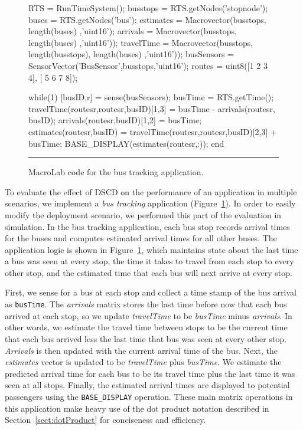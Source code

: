 \begin{figure}[t]
  \begin{macrolab}
    RTS = RunTimeSystem();
    busstops = RTS.getNodes('stopnode'); 
    buses = RTS.getNodes('bus');
    estimates = Macrovector(busstops, length(buses) ,'uint16');
    arrivals = Macrovector(busstops, length(buses) ,'uint16'));
    travelTime = Macrovector(busstops, length(busstops), length(buses) ,'uint16'));
    busSensors = SensorVector('BusSensor',busstops,'uint16');
    routes = uint8({[1 2 3 4], [ 5 6 7 8]}); %

    while(1)
      [busID,r] =  sense(busSensors);
      busTime = RTS.getTime();
      travelTime(routes{r},routes{r},busID)[1,3] = busTime - arrivals(routes{r}, busID);
      arrivals(routes{r},busID)[1,2] = busTime;
      estimates(routes{r},busID) = travelTime(routes{r},routes{r},busID)[2,3] + busTime;
      BASE_DISPLAY(estimates(routes{r},:));
    end
  \end{macrolab}
  \smallskip
  \hrule width 2\columnwidth
  \caption{MacroLab code for the bus tracking application.}
  \label{code:BusTracking}
\end{figure}

To evaluate the effect of DSCD on the performance of an application in multiple
scenarios, we implement a {\em bus tracking} application
(Figure~\ref{code:BusTracking}).  In order to easily modify the deployment
scenario, we performed this part of the evaluation in simulation.  In the bus
tracking application, each bus stop records arrival times for the buses and
computes estimated arrival times for all other buses. The application logic is
shown in Figure~\ref{code:BusTracking}, which maintains state about the last
time a bus was seen at every stop, the time it takes to travel from each stop to
every other stop, and the estimated time that each bus will next arrive at every
stop.

First, we sense for a bus at each stop and collect a time stamp of the bus
arrival as {\tt busTime}. The {\em arrivals} matrix stores the last time before
now that each bus arrived at each stop, so we update \textit{travelTime} to be
\textit{busTime} minus \textit{arrivals}. In other words, we estimate the travel
time between stops to be the current time that each bus arrived less the last
time that bus was seen at every other stop. \textit{Arrivals} is then updated
with the current arrival time of the bus. Next, the \textit{estimates} vector is
updated to be \textit{travelTime} plus \textit{busTime}. We estimate the
predicted arrival time for each bus to be its travel time plus the last time it
was seen at all stops. Finally, the estimated arrival times are displayed to
potential passengers using the {\tt BASE\_DISPLAY} operation.  These main matrix
operations in this application make heavy use of the dot product notation
described in Section~\ref{sect:dotProduct} for conciseness and efficiency.

